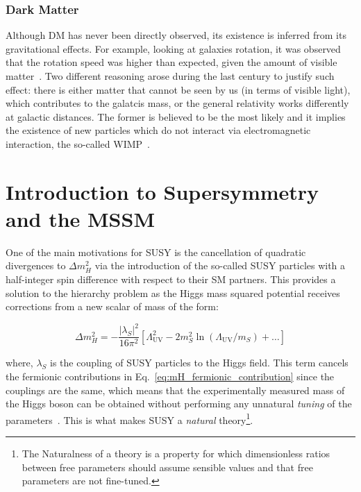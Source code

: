 		\subsubsection*{Dark Matter}

			Although \ac{DM} has never been directly observed, its existence is inferred from its gravitational effects. For example, looking at galaxies rotation, it was observed that the rotation speed was higher than expected, given the amount of visible matter~\cite{Rubin1970}. Two different reasoning arose during the last century to justify such effect: there is either matter that cannot be seen by us (in terms of visible light), which contributes to the galatcis mass, or the general relativity works differently at galactic distances. The former is believed to be the most likely and it implies the existence of new particles which do not interact via electromagnetic interaction, the so-called \ac{WIMP}~\cite{oro44361}.







	\section{Introduction to Supersymmetry and the MSSM}
	\label{sec:SUSY}



		One of the main motivations for \ac{SUSY} is the cancellation of quadratic divergences to $\Delta m_H^2$ via the introduction of the so-called \ac{SUSY} particles with a half-integer spin difference with respect to their \ac{SM} partners. This provides a solution to the hierarchy problem as the Higgs mass squared potential receives corrections from a new scalar of mass of the form:

		\begin{equation}
		\label{eq:mH_scalar_contribution}
			\Delta m_H^2 = - \frac{\left | \lambda_S \right |^2}{16 \pi ^2} \left [  \Lambda_{\mathrm{UV}}^2 - 2m_S^2 \ln \left (\Lambda_{\mathrm{UV}} / m_S \right) + \dots \right ]
		\end{equation}

		\noindent where, $\lambda_S$ is the coupling of \ac{SUSY} particles to the Higgs field. This term cancels the fermionic contributions in Eq.~\ref{eq:mH_fermionic_contribution} since the couplings are the same, which means that the experimentally measured mass of the Higgs boson can be obtained without performing any unnatural \emph{tuning} of the parameters~\cite{susyprimer,Barbieri:1987fn}. This is what makes \ac{SUSY} a \emph{natural} theory\footnote{The Naturalness of a theory is a property for which dimensionless ratios between free parameters should assume sensible values and that free parameters are not fine-tuned.}.

